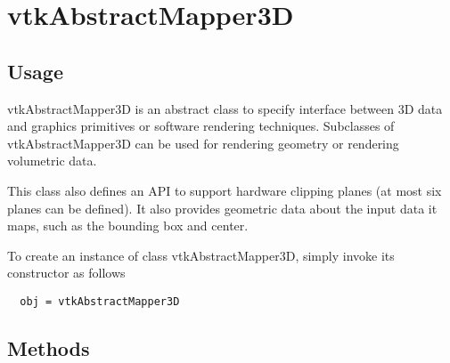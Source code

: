 \section{vtkAbstractMapper3D}

\subsection{Usage}

 vtkAbstractMapper3D is an abstract class to specify interface between 3D
 data and graphics primitives or software rendering techniques. Subclasses
 of vtkAbstractMapper3D can be used for rendering geometry or rendering
 volumetric data.

 This class also defines an API to support hardware clipping planes (at most
 six planes can be defined). It also provides geometric data about the input
 data it maps, such as the bounding box and center.


To create an instance of class vtkAbstractMapper3D, simply
invoke its constructor as follows
\begin{verbatim}
  obj = vtkAbstractMapper3D
\end{verbatim}
\subsection{Methods}


